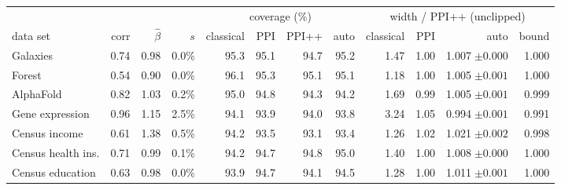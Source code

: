 \begin{tabular}{lrrr rrrr rrrr}
\toprule
 & & & & \multicolumn{4}{c}{coverage (\%)} & \multicolumn{4}{c}{width / PPI++ (unclipped)}\\
\cmidrule(lr){5-8}\cmidrule(lr){9-12}
data set & corr & $\hat\beta$ & $s$ & classical & PPI & PPI++ & auto & classical & PPI & auto & bound\\
\midrule
Galaxies & 0.74 & 0.98 & 0.0\% & 95.3 & 95.1 & 94.7 & 95.2 & 1.47 & 1.00 & 1.007$\;{\scriptstyle\pm0.000}$ & 1.000\\
Forest & 0.54 & 0.90 & 0.0\% & 96.1 & 95.3 & 95.1 & 95.1 & 1.18 & 1.00 & 1.005$\;{\scriptstyle\pm0.001}$ & 1.000\\
AlphaFold & 0.82 & 1.03 & 0.2\% & 95.0 & 94.8 & 94.3 & 94.2 & 1.69 & 0.99 & 1.005$\;{\scriptstyle\pm0.001}$ & 0.999\\
Gene expression & 0.96 & 1.15 & 2.5\% & 94.1 & 93.9 & 94.0 & 93.8 & 3.24 & 1.05 & 0.994$\;{\scriptstyle\pm0.001}$ & 0.991\\
Census income & 0.61 & 1.38 & 0.5\% & 94.2 & 93.5 & 93.1 & 93.4 & 1.26 & 1.02 & 1.021$\;{\scriptstyle\pm0.002}$ & 0.998\\
Census health ins. & 0.71 & 0.99 & 0.1\% & 94.2 & 94.7 & 94.8 & 95.0 & 1.40 & 1.00 & 1.008$\;{\scriptstyle\pm0.000}$ & 1.000\\
Census education & 0.63 & 0.98 & 0.0\% & 93.9 & 94.7 & 94.1 & 94.5 & 1.28 & 1.00 & 1.011$\;{\scriptstyle\pm0.001}$ & 1.000\\
\bottomrule
\end{tabular}